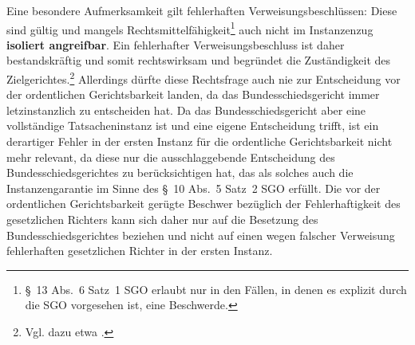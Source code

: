 Eine besondere Aufmerksamkeit gilt fehlerhaften Verweisungsbeschlüssen:
Diese sind gültig und mangels Rechtsmittelfähigkeit\footnote{\S~13 Abs.~6 Satz~1 SGO erlaubt nur in den Fällen, in denen es explizit durch die SGO vorgesehen ist, eine Beschwerde.}  auch nicht im Instanzenzug \textbf{isoliert angreifbar}.
Ein fehlerhafter Verweisungsbeschluss ist daher bestandskräftig und somit rechtswirksam und begründet die Zuständigkeit des Zielgerichtes.\footnote{Vgl. dazu etwa \cite[5]{LSGBB147}.}
Allerdings dürfte diese Rechtsfrage auch nie zur Entscheidung vor der ordentlichen Gerichtsbarkeit landen, da das Bundesschiedsgericht immer letzinstanzlich zu entscheiden hat.
Da das Bundesschiedsgericht aber eine vollständige Tatsacheninstanz ist und eine eigene Entscheidung trifft, ist ein derartiger Fehler in der ersten Instanz für die ordentliche Gerichtsbarkeit nicht mehr relevant, da diese nur die ausschlaggebende Entscheidung des Bundesschiedsgerichtes zu berücksichtigen hat, das als solches auch die Instanzengarantie im Sinne des \S~10 Abs.~5 Satz~2 SGO erfüllt.
Die vor der ordentlichen Gerichtsbarkeit gerügte Beschwer bezüglich der Fehlerhaftigkeit des gesetzlichen Richters kann sich daher nur auf die Besetzung des Bundesschiedsgerichtes beziehen und nicht auf einen wegen falscher Verweisung fehlerhaften gesetzlichen Richter in der ersten Instanz.


\chapterbib
